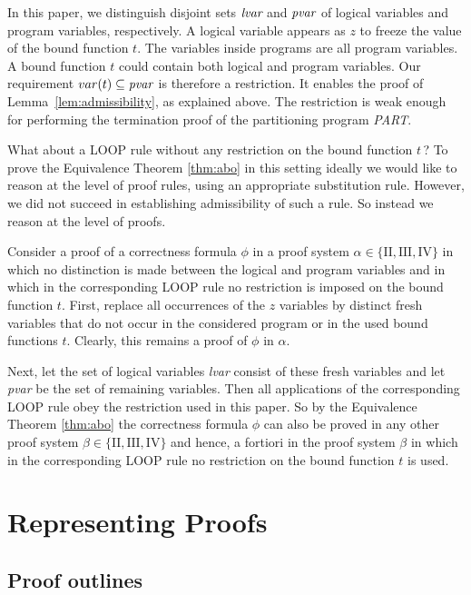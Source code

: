 \documentclass[manuscript, screen, review]{acmart}
\begin{document}
In this paper, we distinguish disjoint sets $\mbox{\it lvar}$ and $\mbox{\it pvar}$
of logical variables and program variables, respectively.
A logical variable appears as $z$ to freeze the value of the bound function $t$.
The variables inside programs are all program variables.
A bound function $t$ could contain both logical and program variables.
Our requirement $var(t) \subseteq \mbox{\it pvar}$ is therefore a restriction.
It enables the proof of Lemma~\ref{lem:admissibility}, as explained above.
The restriction is weak enough for performing the termination proof
of the partitioning program {\it PART}.

What about a LOOP rule without any restriction on the bound function $t$\,?
To prove the Equivalence Theorem \ref{thm:abo} in this setting ideally we would
like to reason at the level of proof rules, using an appropriate
substitution rule. However, we did not succeed in establishing
admissibility of such a rule. So instead we reason at the level of
proofs.

Consider a proof of a correctness formula $\phi$ in a proof system
$\alpha \in \{\mathrm{II, III, IV}\}$ in which no distinction is made
between the logical and program variables and in which in the
corresponding LOOP rule no restriction is imposed on the bound
function $t$. First, replace all occurrences of the $z$ variables by
distinct fresh variables that do not occur in the considered program
or in the used bound functions $t$. Clearly, this remains a proof of
$\phi$ in $\alpha$.

Next, let the set of logical variables \emph{lvar} consist of these
fresh variables and let \emph{pvar} be the set of remaining variables.
Then all applications of the corresponding LOOP rule obey the
restriction used in this paper. So by the Equivalence Theorem
\ref{thm:abo} the correctness formula $\phi$ can also be proved in any
other proof system $\beta \in \{\mathrm{II, III, IV}\}$ and hence,
a fortiori in the proof system $\beta$ in which in the corresponding
LOOP rule no restriction on the bound function $t$ is used.



\section{Representing Proofs}
\label{sec:rep-proofs}

\subsection{Proof outlines}
\end{document}
